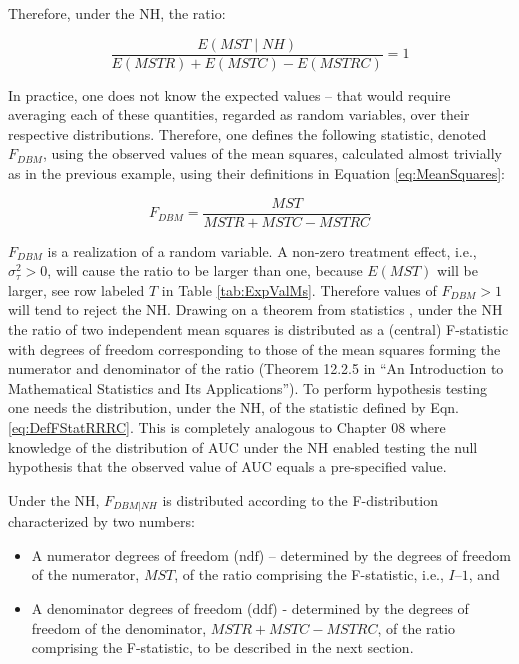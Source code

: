 \documentclass[
]{book}
\providecommand{\tightlist}{%
  \setlength{\itemsep}{0pt}\setlength{\parskip}{0pt}}
\begin{document}
Therefore, under the NH, the ratio:

\begin{equation}
\frac{E\left ( MST\mid NH \right )}{E\left ( MSTR \right ) + E\left ( MSTC \right )  - E\left ( MSTRC \right )} = 1
\label{eq:ConstrFRatio}
\end{equation}

In practice, one does not know the expected values -- that would require averaging each of these quantities, regarded as random variables, over their respective distributions. Therefore, one defines the following statistic, denoted \(F_{DBM}\), using the observed values of the mean squares, calculated almost trivially as in the previous example, using their definitions in Equation \eqref{eq:MeanSquares}:

\begin{equation}
F_{DBM} = \frac{MST}{MSTR + MSTC - MSTRC}
\label{eq:DefFStatRRRC}
\end{equation}

\(F_{DBM}\) is a realization of a random variable. A non-zero treatment effect, i.e., \(\sigma_{\tau}^{2} > 0\), will cause the ratio to be larger than one, because \(E\left ( MST \right)\) will be larger, see row labeled \(T\) in Table \ref{tab:ExpValMs}. Therefore values of \(F_{DBM} > 1\) will tend to reject the NH. Drawing on a theorem from statistics \citep{RN1492}, under the NH the ratio of two independent mean squares is distributed as a (central) F-statistic with degrees of freedom corresponding to those of the mean squares forming the numerator and denominator of the ratio (Theorem 12.2.5 in ``An Introduction to Mathematical Statistics and Its Applications''). To perform hypothesis testing one needs the distribution, under the NH, of the statistic defined by Eqn. \eqref{eq:DefFStatRRRC}. This is completely analogous to Chapter 08 where knowledge of the distribution of AUC under the NH enabled testing the null hypothesis that the observed value of AUC equals a pre-specified value.

Under the NH, \(F_{DBM|NH}\) is distributed according to the F-distribution characterized by two numbers:

\begin{itemize}
\tightlist
\item
  A numerator degrees of freedom (\(\text{ndf}\)) -- determined by the degrees of freedom of the numerator, \(MST\), of the ratio comprising the F-statistic, i.e., \(I – 1\), and
\item
  A denominator degrees of freedom (\(\text{ddf}\)) - determined by the degrees of freedom of the denominator, \(MSTR + MSTC - MSTRC\), of the ratio comprising the F-statistic, to be described in the next section.
\end{itemize}
\end{document}
